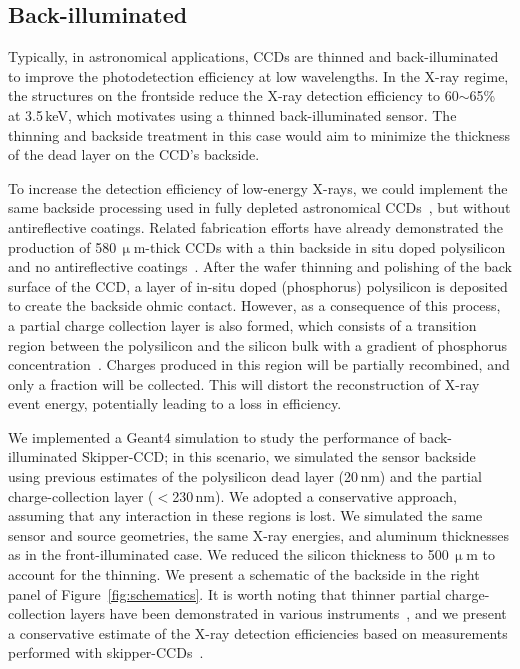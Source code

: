 \documentclass[twocolumn]{aastex631}
\begin{document}
\subsection{Back-illuminated} 

Typically, in astronomical applications, CCDs are thinned and back-illuminated to improve the photodetection efficiency at low wavelengths. In the X-ray regime, the structures on the frontside reduce the X-ray detection efficiency to 60$\sim$65\% at 3.5\,keV, which motivates using a thinned back-illuminated sensor. The thinning and backside treatment in this case would aim to minimize the thickness of the dead layer on the CCD's backside. 

To increase the detection efficiency of low-energy X-rays, we could implement the same backside processing used in fully depleted astronomical CCDs~\cite{Holland:2003}, but without antireflective coatings. Related fabrication efforts have already demonstrated the production of 580\,$\upmu$m-thick CCDs with a thin backside in situ doped polysilicon and no antireflective coatings~\cite{grailCCD}. After the wafer thinning and polishing of the back surface of the CCD, a layer of in-situ doped (phosphorus) polysilicon is deposited to create the backside ohmic contact. However, as a consequence of this process, a partial charge collection layer is also formed, which consists of a transition region between the polysilicon and the silicon bulk with a gradient of phosphorus concentration~\cite{fernandezmoroni2020charge}. Charges produced in this region will be partially recombined, and only a fraction will be collected. This will distort the reconstruction of X-ray event energy, potentially leading to a loss in efficiency. 

We implemented a Geant4 simulation to study the performance of back-illuminated Skipper-CCD; in this scenario, we simulated the sensor backside using previous estimates of the polysilicon dead layer (20\,nm) and the partial charge-collection layer ($<$230\,nm). We adopted a conservative approach, assuming that any interaction in these regions is lost. We simulated the same sensor and source geometries, the same X-ray energies, and aluminum thicknesses as in the front-illuminated case. We reduced the silicon thickness to 500\,$\upmu$m to account for the thinning. We present a schematic of the backside in the right panel of Figure~\ref{fig:schematics}. It is worth noting that thinner partial charge-collection layers have been demonstrated in various instruments~\cite{backside1,backside2}, and we present a conservative estimate of the X-ray detection efficiencies based on measurements performed with skipper-CCDs~\cite{pcc, pcc2}. 
\end{document}
